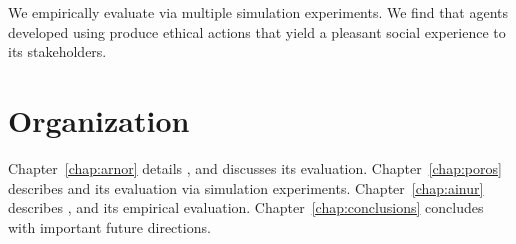 
We empirically evaluate \frameworkAinur via multiple simulation 
experiments. We find that agents developed using \frameworkAinur produce ethical actions that 
yield a pleasant social experience to its stakeholders.

\section{Organization}
Chapter~\ref{chap:arnor} details \frameworkA, and discusses its evaluation. 
Chapter~\ref{chap:poros} describes \frameworkB and its 
evaluation via simulation experiments. 
Chapter~\ref{chap:ainur} describes \frameworkAinur, and its empirical evaluation.  
Chapter~\ref{chap:conclusions} concludes with important future directions.